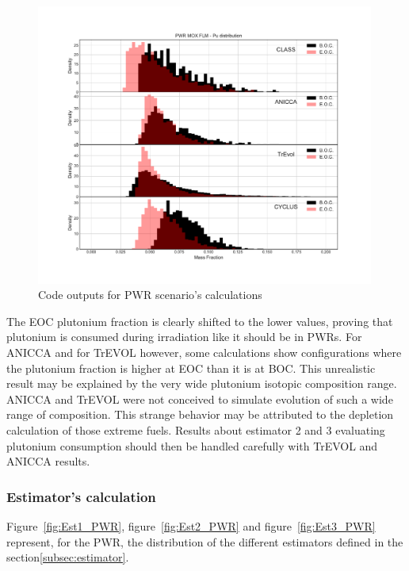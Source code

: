 \begin{figure}[h]
	\begin{center}
		\includegraphics[width = 0.99\textwidth]{../../Feature_1/RAW_DATA/FIG/PWR_MOX_FLM_Pu.pdf}
		\caption{Code outputs for \gls{PWR} scenario's calculations}
		\label{fig:PWR_MOX_FLM_Pu}
	\end{center}
\end{figure}

The EOC plutonium fraction is clearly shifted to the lower values, proving that
plutonium is consumed during irradiation like it should be in \gls{PWR}s. For ANICCA
and for TrEVOL however, some calculations show configurations where the
plutonium fraction is higher at EOC than it is at \gls{BOC}. This unrealistic
result may be explained by the very wide plutonium isotopic composition range.
ANICCA and TrEVOL were not conceived to simulate evolution of such a wide range
of composition. This strange behavior may be attributed to the depletion
calculation of those extreme fuels. Results about estimator 2 and 3 evaluating
plutonium consumption should then be handled carefully with TrEVOL and ANICCA
results.   


\subsubsection{Estimator's calculation}

Figure~\ref{fig:Est1_PWR}, figure~\ref{fig:Est2_PWR} and
figure~\ref{fig:Est3_PWR} represent, for the \gls{PWR}, the distribution of the
different estimators defined in the section\ref{subsec:estimator}. 

